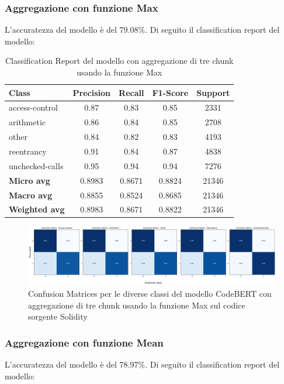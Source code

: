 \documentclass[../../Thesis.tex]{subfiles}
\begin{document}
\subsubsection{Aggregazione con funzione Max}
L'accuratezza del modello \`e del 79.08\%. Di seguito il classification report del modello:
\begin{table}[H]
    \centering
    \small
    \begin{tabular}{lcccc}
    \hline
    \textbf{Class} & \textbf{Precision} & \textbf{Recall} & \textbf{F1-Score} & \textbf{Support} \\
    \hline
    access-control & 0.87 & 0.83 & 0.85 & 2331 \\
    arithmetic & 0.86 & 0.84 & 0.85 & 2708 \\
    other & 0.84 & 0.82 & 0.83 & 4193 \\
    reentrancy & 0.91 & 0.84 & 0.87 & 4838 \\
    unchecked-calls & 0.95 & 0.94 & 0.94 & 7276 \\
    \hline
    \textbf{Micro avg} & 0.8983 & 0.8671 & 0.8824 & 21346 \\
    \textbf{Macro avg} & 0.8855 & 0.8524 & 0.8685 & 21346 \\
    \textbf{Weighted avg} & 0.8983 & 0.8671 & 0.8822 & 21346 \\
    \hline
    \end{tabular}
    \caption{Classification Report del modello con aggregazione di tre chunk usando la funzione Max}
    \end{table}

    \begin{figure}[H]
        \includegraphics[width=1.05\textwidth]{../../img/CFMax3-SC.png}
        \caption{Confusion Matrices per le diverse classi del modello CodeBERT con aggregazione di tre chunk usando la funzione Max sul codice sorgente Solidity}
    \end{figure}
    

\subsubsection{Aggregazione con funzione Mean}
L'accuratezza del modello \`e del 78.97\%. Di seguito il classification report del modello:
\end{document}
